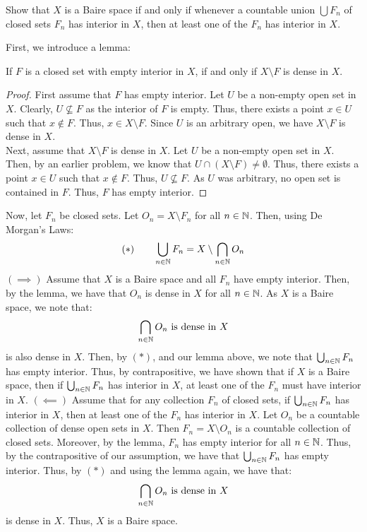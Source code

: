 \documentclass[12pt]{article}
\begin{document}
\begin{problem}{9}
    Show that $X$ is a Baire space if and only if whenever a countable union $\bigcup F_n$ of closed sets $F_n$ has interior in $X$, then at least one of the $F_n$ has interior in $X$.
\end{problem}
\begin{solution}
    First, we introduce a lemma: 
    \begin{lemma}
        If $F$ is a closed set with empty interior in $X$, if and only if $X \setminus F$ is dense in $X$.         
    \end{lemma}
    \begin{proof}
        First assume that $F$ has empty interior. Let $U$ be a non-empty open set in $X$. Clearly, $U \not \subseteq F$ as the interior of $F$ is empty. Thus, there exists a point $x \in U$ such that $x \not \in F$. Thus, $x \in X \setminus F$. Since $U$ is an arbitrary open, we have $X \setminus F$ is dense in $X$. \\
        Next, assume that $X \setminus F$ is dense in $X$. Let $U$ be a non-empty open set in $X$. Then, by an earlier problem, we know that $U \cap (X \setminus F) \neq \emptyset$. Thus, there exists a point $x \in U$ such that $x \not \in F$. Thus, $U \not \subseteq F$. As $U$ was arbitrary, no open set is contained in $F$. Thus, $F$ has empty interior.         
    \end{proof}
    \bbni
    Now, let $F_n$ be closed sets. Let $O_n = X \setminus F_n$ for all $n \in \mathbb N$. Then, using De Morgan's Laws:
    \[(*) \qquad \bigcup_{n \in \mathbb N} F_n = X \setminus \bigcap_{n \in \mathbb N} O_n \]
    $(\implies)$ Assume that $X$ is a Baire space and all $F_n$ have empty interior. Then, by the lemma, we have that $O_n$ is dense in $X$ for all $n \in \mathbb N$. As $X$ is a Baire space, we note that:
    \[ \bigcap_{n \in \mathbb N} O_n \text{ is dense in $X$} \]
    is also dense in $X$. Then, by $(*)$, and our lemma above, we note that $\bigcup_{n \in \mathbb N} F_n$ has empty interior. Thus, by contrapositive, we have shown that if $X$ is a Baire space, then if $\bigcup_{n \in \mathbb N} F_n$ has interior in $X$, at least one of the $F_n$ must have interior in $X$. \bbni
    $(\impliedby)$ Assume that for any collection $F_n$ of closed sets, if $\bigcup_{n \in \mathbb N} F_n$ has interior in $X$, then at least one of the $F_n$ has interior in $X$. Let $O_n$ be a countable collection of dense open sets in $X$. Then $F_n = X \setminus O_n$ is a countable collection of closed sets. Moreover, by the lemma, $F_n$ has empty interior for all $n \in \mathbb N$. Thus, by the contrapositive of our assumption, we have that $\bigcup_{n \in \mathbb N} F_n$ has empty interior. Thus, by $(*)$ and using the lemma again, we have that:
    \[ \bigcap_{n \in \mathbb N} O_n \text{ is dense in $X$} \]
    is dense in $X$. Thus, $X$ is a Baire space.
\end{solution}
\newpage 
\end{document}
